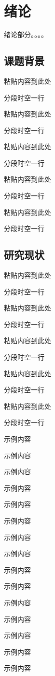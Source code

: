 \chapter{绪论}
绪论部分。。。。
\section{课题背景}
粘贴内容到此处

分段时空一行

粘贴内容到此处

分段时空一行

粘贴内容到此处

分段时空一行

粘贴内容到此处

分段时空一行

粘贴内容到此处

分段时空一行

\section{研究现状}
粘贴内容到此处

分段时空一行

粘贴内容到此处

分段时空一行

粘贴内容到此处

分段时空一行

粘贴内容到此处

分段时空一行

粘贴内容到此处

分段时空一行

示例内容

示例内容

示例内容

示例内容

示例内容

示例内容

示例内容

示例内容

示例内容

示例内容

示例内容

示例内容

示例内容

示例内容

示例内容
